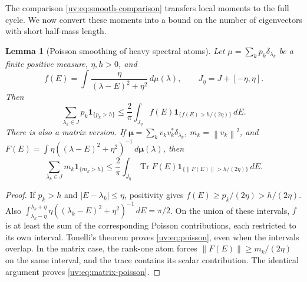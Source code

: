 \documentclass[11pt]{article}
\numberwithin{equation}{section}
\newtheorem{lemma}[theorem]{Lemma}
\theoremstyle{remark}
\newcommand{\Tr}{\operatorname{Tr}}
\newcommand{\one}{\mathbf 1}
\newcommand{\norm}[1]{\left\|#1\right\|}
\begin{document}
The comparison \eqref{uv:eq:smooth-comparison} transfers local moments to the full cycle. We now convert these moments into a bound on the number of eigenvectors with short half-mass length.
\begin{lemma}[Poisson smoothing of heavy spectral atoms]
\label{uv:lem:poisson}
Let $\mu=\sum_k p_k\delta_{\lambda_k}$ be a finite positive measure,
$\eta,h>0$, and
\[
 f(E)=\int\frac{\eta}{(\lambda-E)^2+\eta^2}\,d\mu(\lambda),
 \qquad J_\eta=J+[-\eta,\eta].
\]
Then
\begin{equation}\label{uv:eq:poisson}
 \sum_{\lambda_k\in J}p_k\one_{\{p_k>h\}}
 \le\frac2\pi\int_{J_\eta}
       f(E)\one_{\{f(E)>h/(2\eta)\}}\,dE.
\end{equation}
There is also a matrix version. If
$\boldsymbol\mu=\sum_k v_kv_k^*\delta_{\lambda_k}$,
$m_k=\norm{v_k}^2$, and
$F(E)=\int\eta((\lambda-E)^2+\eta^2)^{-1}\,d\boldsymbol\mu(\lambda)$,
then
\begin{equation}\label{uv:eq:matrix-poisson}
 \sum_{\lambda_k\in J}m_k\one_{\{m_k>h\}}
 \le\frac2\pi\int_{J_\eta}
       \Tr F(E)\one_{\{\norm{F(E)}>h/(2\eta)\}}\,dE.
\end{equation}
\end{lemma}
\begin{proof}
If $p_k>h$ and $|E-\lambda_k|\le\eta$, positivity gives
$f(E)\ge p_k/(2\eta)>h/(2\eta)$.
Also
$\int_{\lambda_k-\eta}^{\lambda_k+\eta}
\eta((\lambda_k-E)^2+\eta^2)^{-1}\,dE=\pi/2$.
On the union of these intervals, $f$ is at least the sum of the
corresponding Poisson contributions, each restricted to its own
interval. Tonelli's theorem proves \eqref{uv:eq:poisson}, even when
the intervals overlap. In the matrix case, the rank-one atom
forces $\norm{F(E)}\ge m_k/(2\eta)$ on the same interval, and the
trace contains its scalar contribution. The identical argument
proves \eqref{uv:eq:matrix-poisson}.
\end{proof}
\end{document}
